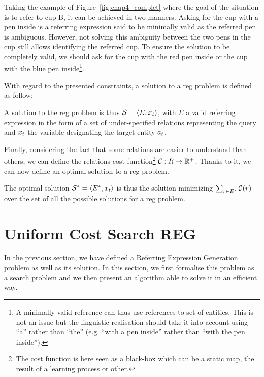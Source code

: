 Taking the example of Figure~\ref{fig:chap4_complet} where the goal of the situation is to refer to cup B, it can be achieved in two manners. Asking for the cup with a pen inside is a referring expression said to be minimally valid as the referred pen is ambiguous. However, not solving this ambiguity between the two pens in the cup still allows identifying the referred cup. To ensure the solution to be completely valid, we should ask for the cup with the red pen inside or the cup with the blue pen inside\footnote{A minimally valid reference can thus use references to set of entities. This is not an issue but the linguistic realisation should take it into account using ``a'' rather than ``the'' (e.g. ``with a pen inside'' rather than ``with the pen inside'').}.

\newpage

With regard to the presented constraints, a solution to a \acrshort{reg} problem is defined as follow:

\begin{definition}
A solution to the \acrshort{reg} problem is thus $\mathcal{S} = \langle E, x_t \rangle$, with $E$ a valid referring expression in the form of a set of under-specified relations representing the \sparql{} query and $x_t$ the variable designating the target entity $a_t$.
\end{definition}


Finally, considering the fact that some relations are easier to understand than others, we can define the relations cost function\footnote{The cost function is here seen as a black-box which can be a static map, the result of a learning process or other.} $\mathcal{C} : R \rightarrow \mathbb{R}^+$. Thanks to it, we can now define an optimal solution to a \acrshort{reg} problem.

\begin{definition}
The optimal solution $\mathcal{S}^* = \langle E^*, x_t \rangle$ is thus the solution minimizing $\sum_{r \in E^*} \mathcal{C}(r)$ over the set of all the possible solutions for a \acrshort{reg} problem.
\end{definition}


\section{Uniform Cost Search REG}

In the previous section, we have defined a Referring Expression Generation problem as well as its solution. In this section, we first formalise this problem as a search problem and we then present an algorithm able to solve it in an efficient way.

